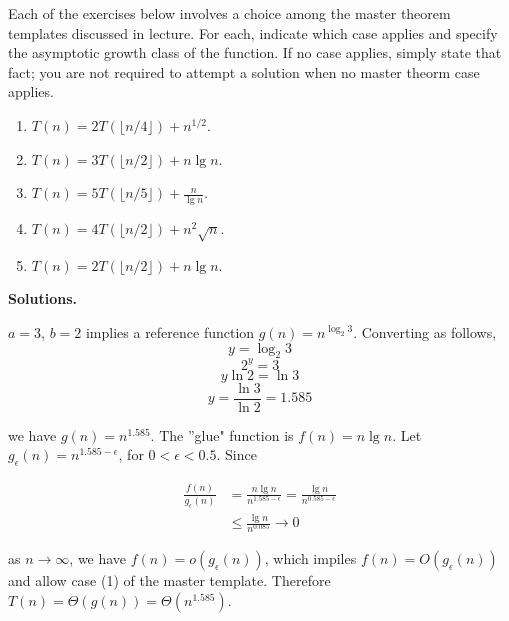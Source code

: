 \documentclass{article}
\begin{document}
	Each of the exercises below involves a choice among the master theorem templates discussed in lecture. For each, indicate which case applies and specify the asymptotic growth class of the function. If no case applies, simply state that fact; you are not required to attempt a solution when no master theorm case applies.
	
	\begin{enumerate}
		\item $T(n) = 2T(\lfloor n/4 \rfloor) + n^{1/2}$.
		\item $T(n) = 3T(\lfloor n/2 \rfloor) + n \lg n$.
		\item $T(n) = 5T(\lfloor n/5 \rfloor) + \frac{n}{\lg n}$.
		\item $T(n) = 4T(\lfloor n/2 \rfloor) + n^2\sqrt{n}$.
		\item $T(n) = 2T(\lfloor n/2 \rfloor) + n \lg n $.
	\end{enumerate}
	
	\textbf{Solutions.}
	
	$a = 3$, $b = 2$ implies a reference  function $g(n) = n^{\log_2 3}$. Converting as follows,
	\[
	y = \log_2 3
	\]
	\[
	2^y = 3
	\]
	\[
	y\ln 2 = \ln 3
	\]
	\[
	y = \frac{\ln 3}{\ln 2} = 1.585
	\]
	
	we have $g(n) = n^{1.585}$. The ''glue" function is $f(n) = n\lg n$. Let $g_\epsilon(n) = n^{1.585 - \epsilon}$, for $0 < \epsilon < 0.5$. Since
	
	
	\begin{align*}
	\frac{f(n)}{g_\epsilon(n)} &= \frac{n \lg n}{n^{1.585-\epsilon}} = \frac{\lg n}{n^{0.585-\epsilon}}\\
	                           &\leq \frac{\lg n}{n^{0.085}} \to 0
	\end{align*}
	
	
	as $n \to \infty$, we have $f(n) = o(g_\epsilon(n))$, which impiles $f(n) = O(g_\epsilon(n))$ and allow case (1) of the master template. Therefore $T(n) = \Theta(g(n)) = \Theta(n^{1.585})$.
	
\end{document}
